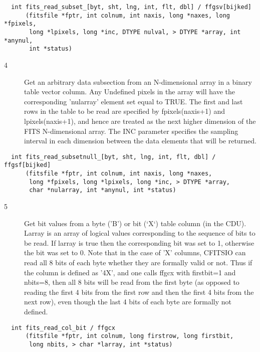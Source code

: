 \begin{verbatim}
  int fits_read_subset_[byt, sht, lng, int, flt, dbl] / ffgsv[bijked]
      (fitsfile *fptr, int colnum, int naxis, long *naxes, long *fpixels,
       long *lpixels, long *inc, DTYPE nulval, > DTYPE *array, int *anynul,
       int *status)
\end{verbatim}

\begin{description}
\item[4 ] Get an arbitrary data subsection from an N-dimensional array
    in a binary table vector column.  Any Undefined
    pixels in the array will have the corresponding 'nularray'
    element set equal to TRUE.  The first and last rows in the table
    to be read are specified by fpixels(naxis+1) and lpixels(naxis+1),
    and hence are treated as the next higher dimension of the FITS
    N-dimensional array.  The INC parameter specifies the sampling
    interval in each dimension between the data elements that will be
   returned.
\end{description}

\begin{verbatim}
  int fits_read_subsetnull_[byt, sht, lng, int, flt, dbl] / ffgsf[bijked]
      (fitsfile *fptr, int colnum, int naxis, long *naxes,
       long *fpixels, long *lpixels, long *inc, > DTYPE *array,
       char *nularray, int *anynul, int *status)
\end{verbatim}

\begin{description}
\item[5 ] Get bit values from a byte ('B') or bit (`X`) table column (in the
    CDU).  Larray is an array of logical values corresponding to the
    sequence of bits to be read.  If larray is true then the
    corresponding bit was set to 1, otherwise the bit was set to 0.
    Note that in the case of 'X' columns, CFITSIO can read  all 8 bits
    of each byte whether they are formally valid or not.  Thus if the
    column is defined as '4X', and one calls ffgcx with  firstbit=1 and
    nbits=8, then all 8 bits will be read from the first byte (as
    opposed to reading the first 4 bits from the first row and then the
    first 4 bits from the next row), even though the last 4 bits of
   each byte are formally not defined.
\end{description}

\begin{verbatim}
  int fits_read_col_bit / ffgcx
      (fitsfile *fptr, int colnum, long firstrow, long firstbit,
       long nbits, > char *larray, int *status)
\end{verbatim}

